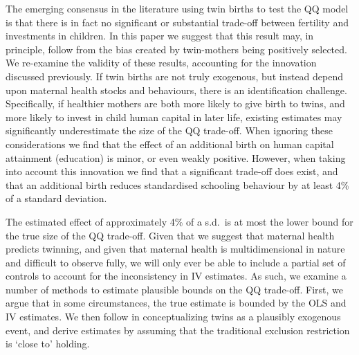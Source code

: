 The emerging consensus in the literature using twin births to test the QQ 
model is that there is in fact no significant or substantial trade-off between 
fertility and investments in children. In this paper we suggest that this result 
may, in principle, follow from the bias created by twin-mothers being positively 
selected. We re-examine the validity of these results, accounting for the 
innovation discussed previously.  If twin births are not truly exogenous, but 
instead depend upon maternal health stocks and behaviours, there is an 
identification challenge.  Specifically, if healthier mothers are both more 
likely to give birth to twins, and more likely to invest in child human capital 
in later life, existing estimates may significantly underestimate the size of 
the QQ trade-off.  When ignoring these considerations we find that the effect 
of an additional birth on human capital attainment (education) is minor, or even 
weakly positive. However, when taking into account this innovation we find that 
a significant trade-off does exist, and that an additional birth reduces 
standardised schooling behaviour by at least 4\% of a standard deviation.

The estimated effect of approximately 4\% of a s.d.\ is at most the lower bound 
for the true size of the QQ trade-off. Given that we suggest that maternal 
health predicts twinning, and given that maternal health is multidimensional in 
nature and difficult to observe fully, we will only ever be able to include a 
partial set of controls to account for the inconsistency in IV estimates. As 
such, we examine a number of methods to estimate plausible bounds on the QQ 
trade-off. First, we argue that in some circumstances, the true estimate is 
bounded by the OLS and IV estimates. We then follow \citet{Conleyetal2012} in 
conceptualizing twins as a plausibly exogenous event, and derive estimates by 
assuming that the traditional exclusion restriction is `close to' holding.

